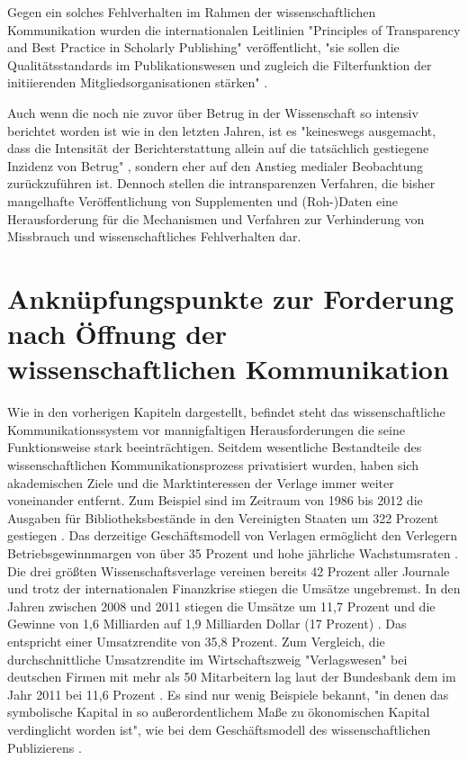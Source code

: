 Gegen ein solches Fehlverhalten im Rahmen der wissenschaftlichen Kommunikation wurden die internationalen Leitlinien "Principles of Transparency and Best Practice in Scholarly Publishing" \cite{oaspa_principles_2013} veröffentlicht, "sie sollen die Qualitätsstandards im Publikationswesen und zugleich die Filterfunktion der initiierenden Mitgliedsorganisationen stärken" \cite{Bargheer_2015}.

Auch wenn die noch nie zuvor über Betrug in der Wissenschaft so intensiv berichtet worden ist \cite{brembs2015open} wie in den letzten Jahren, ist es "keineswegs ausgemacht, dass die Intensität der Berichterstattung allein auf die tatsächlich gestiegene Inzidenz von Betrug" \cite{weingart_2005_wissenschaft}, sondern eher auf den Anstieg medialer Beobachtung zurückzuführen ist. Dennoch stellen die intransparenzen Verfahren, die bisher mangelhafte Veröffentlichung von Supplementen und (Roh-)Daten eine Herausforderung für die Mechanismen und Verfahren zur Verhinderung von Missbrauch und wissenschaftliches Fehlverhalten dar.

\section{Anknüpfungspunkte zur Forderung nach Öffnung der wissenschaftlichen Kommunikation}

Wie in den vorherigen Kapiteln dargestellt, befindet steht das wissenschaftliche Kommunikationssystem vor mannigfaltigen Herausforderungen die seine Funktionsweise stark beeinträchtigen. Seitdem wesentliche Bestandteile des wissenschaftlichen Kommunikationsprozess privatisiert wurden, haben sich akademischen Ziele und die Marktinteressen der Verlage immer weiter voneinander entfernt. Zum Beispiel sind im Zeitraum von 1986 bis 2012 die Ausgaben für Bibliotheksbestände in den Vereinigten Staaten um 322 Prozent gestiegen \cite{lewis_2015_future}. Das derzeitige Geschäftsmodell von Verlagen ermöglicht den Verlegern Betriebsgewinnmargen von über 35 Prozent \cite{russell_2008_business} \cite{cope2014future} und hohe jährliche Wachstumsraten \cite{Martin_2013} \cite{Wellcome_Trust_2003}. Die drei größten Wissenschaftsverlage vereinen bereits 42 Prozent aller Journale und trotz der internationalen Finanzkrise stiegen die Umsätze ungebremst. In den Jahren zwischen 2008 und 2011 stiegen die Umsätze um 11,7 Prozent und die Gewinne von 1,6 Milliarden auf 1,9 Milliarden Dollar (17 Prozent) \cite{cope2014future}. Das entspricht einer Umsatzrendite von 35,8 Prozent. Zum Vergleich, die durchschnittliche Umsatzrendite im Wirtschaftszweig "Verlagswesen" bei deutschen Firmen mit mehr als 50 Mitarbeitern lag laut der Bundesbank dem im Jahr 2011 bei 11,6 Prozent \cite{bundesbank_2014}. Es sind nur wenig Beispiele bekannt, "in denen das symbolische Kapital in so außerordentlichem Maße zu ökonomischen Kapital verdinglicht worden ist", wie bei dem Geschäftsmodell des wissenschaftlichen Publizierens \cite{hagner_2015_sache_buches}.

